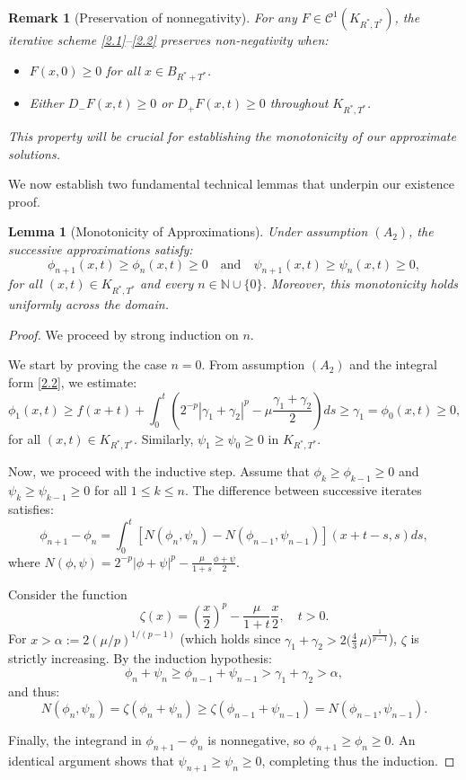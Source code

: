 \documentclass[
  sn-mathphys-num,
  colorlinks,
  linkcolor=darkmagenta,
  citecolor=rufous,
  urlcolor=zaffre,
  hypertexnames=false
]{sn-jnl}
\numberwithin{equation}{section}
\newtheorem{lemma}[theorem]{Lemma}%
\newtheorem{remark}[theorem]{Remark}%
\begin{document}
\begin{remark}[Preservation of nonnegativity]
\rm 
For any $F \in \mathcal{C}^1(K_{R^*,T^*})$, the iterative scheme \eqref{2.1}--\eqref{2.2} preserves non-negativity when:
\begin{itemize}
    \item[$(i)$] $F(x,0) \geq 0$ for all $x \in B_{R^* + T^*}$.
    \item[$(ii)$] Either $D_-F(x,t) \geq 0$ or $D_+F(x,t) \geq 0$ throughout $K_{R^*,T^*}$.
\end{itemize}
This property will be crucial for establishing the monotonicity of our approximate solutions.
\end{remark}

We now establish two fundamental technical lemmas that underpin our existence proof.

\begin{lemma}[Monotonicity of Approximations]\label{lem:2.1}
Under assumption $(A_2)$, the successive approximations satisfy:
$$
\phi_{n+1}(x,t) \geq \phi_n(x,t) \geq 0 \quad \text{and} \quad \psi_{n+1}(x,t) \geq \psi_n(x,t) \geq 0,
$$
for all $(x,t) \in K_{R^*,T^*}$ and every $n \in \mathbb{N} \cup \{0\}$. Moreover, this monotonicity holds uniformly across the domain.
\end{lemma}


\begin{proof}
We proceed by strong induction on $n$. 

\noindent
We start by proving the case $n=0$. From assumption $(A_2)$ and the integral form \eqref{2.2}, we estimate:
$$
\phi_1(x,t) \geq f(x+t) + \int_0^t \left(2^{-p}|\gamma_1+\gamma_2|^p - \mu\frac{\gamma_1+\gamma_2}{2}\right) ds \geq \gamma_1 = \phi_0(x,t) \geq 0,
$$
for all $(x,t)\in K_{R^*,T^*}$. Similarly, $\psi_1 \geq \psi_0 \geq 0$ in $K_{R^*,T^*}$.

Now, we proceed with the inductive step. Assume that $\phi_k \geq \phi_{k-1} \geq 0$ and $\psi_k \geq \psi_{k-1} \geq 0$ for all $1 \leq k \leq n$. The difference between successive iterates satisfies:
$$
\phi_{n+1} - \phi_n = \int_0^t \left[N(\phi_n,\psi_n) - N(\phi_{n-1},\psi_{n-1})\right](x+t-s,s) ds,
$$
where $\displaystyle N(\phi,\psi) = 2^{-p}|\phi+\psi|^p - \frac{\mu}{1+s}\frac{\phi+\psi}{2}$.

 Consider the function
$$
\zeta(x) = \left(\frac{x}{2}\right)^p - \frac{\mu}{1+t}\frac{x}{2}, \quad t > 0.
$$
For $x > \alpha := 2(\mu/p)^{1/(p-1)}$ (which holds since $\gamma_1+\gamma_2 > 2\Big(\tfrac{4}{3}\,\mu\Big)^{\!\frac{1}{p-1}}$), $\zeta$ is strictly increasing. By the induction hypothesis:
$$
\phi_n + \psi_n \geq \phi_{n-1} + \psi_{n-1} > \gamma_1 + \gamma_2 > \alpha,
$$
and thus:
$$
N(\phi_n,\psi_n) = \zeta(\phi_n+\psi_n) \geq \zeta(\phi_{n-1}+\psi_{n-1}) = N(\phi_{n-1},\psi_{n-1}).
$$

Finally, the integrand in $\phi_{n+1}-\phi_n$ is nonnegative, so $\phi_{n+1} \geq \phi_n \geq 0$. An identical argument shows that $\psi_{n+1} \geq \psi_n \geq 0$, completing thus the induction.
\end{proof}
\end{document}
